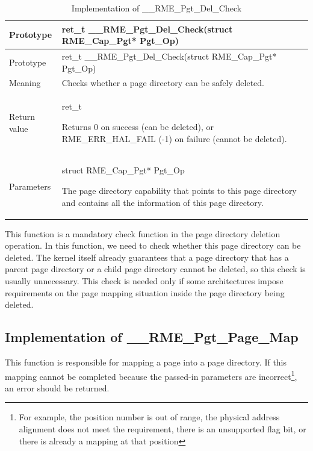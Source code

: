 \begin{xltabular}{\textwidth}{@{}>{\hsize\raggedright\arraybackslash}X>{\hsize\raggedright\arraybackslash}X@{}}
\caption{Implementation of \_\_RME\_Pgt\_Del\_Check}\label{tab:7-78-rme-pgt-del-check-implementation}\\
\toprule
Prototype & ret\_t \_\_RME\_Pgt\_Del\_Check(struct RME\_Cap\_Pgt*
Pgt\_Op)\tabularnewline
\endfirsthead
\toprule
Prototype & ret\_t \_\_RME\_Pgt\_Del\_Check(struct RME\_Cap\_Pgt*
Pgt\_Op)\tabularnewline
\midrule
\endhead
\bottomrule
\endlastfoot
Meaning & Checks whether a page directory can be safely deleted.\tabularnewline
Return value\strut
 & ret\_t

Returns 0 on success (can be deleted), or RME\_ERR\_HAL\_FAIL (-1) on failure (cannot be deleted).\strut
\tabularnewline
Parameters\strut
 & struct RME\_Cap\_Pgt* Pgt\_Op

The page directory capability that points to this page directory and contains all the information of this page directory.\strut
\tabularnewline
\end{xltabular}
\nopagebreak[4]

This function is a mandatory check function in the page directory deletion operation. In this function, we need to check whether this page directory can be deleted. The kernel itself already guarantees that a page directory that has a parent page directory or a child page directory cannot be deleted, so this check is usually unnecessary. This check is needed only if some architectures impose requirements on the page mapping situation inside the page directory being deleted.

\subsection{Implementation of \_\_RME\_Pgt\_Page\_Map}\label{subsec:7-rme-pgt-page-map-implementation}

This function is responsible for mapping a page into a page directory. If this mapping cannot be completed because the passed-in parameters are incorrect\footnote{For example, the position number is out of range, the physical address alignment does not meet the requirement, there is an unsupported flag bit, or there is already a mapping at that position}, an error should be returned.

